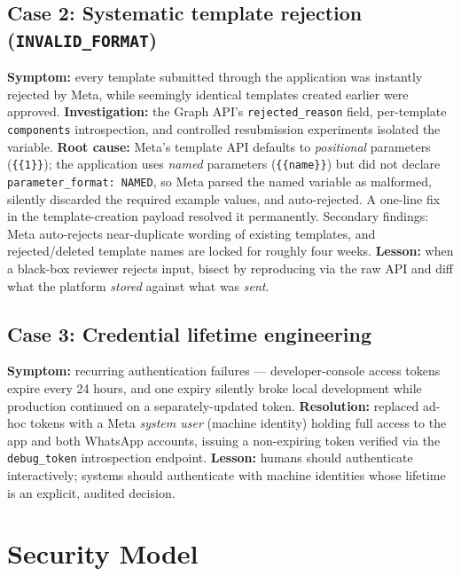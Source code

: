 \documentclass[11pt,a4paper]{article}
\begin{document}
\subsection{Case 2: Systematic template rejection (\texttt{INVALID\_FORMAT})}
\textbf{Symptom:} every template submitted through the application was
instantly rejected by Meta, while seemingly identical templates created
earlier were approved. \textbf{Investigation:} the Graph API's
\texttt{rejected\_reason} field, per-template \texttt{components}
introspection, and controlled resubmission experiments isolated the
variable. \textbf{Root cause:} Meta's template API defaults to
\emph{positional} parameters (\texttt{\{\{1\}\}}); the application uses
\emph{named} parameters (\texttt{\{\{name\}\}}) but did not declare
\texttt{parameter\_format: NAMED}, so Meta parsed the named variable as
malformed, silently discarded the required example values, and
auto-rejected. A one-line fix in the template-creation payload resolved
it permanently. Secondary findings: Meta auto-rejects near-duplicate
wording of existing templates, and rejected/deleted template names are
locked for roughly four weeks. \textbf{Lesson:} when a black-box reviewer
rejects input, bisect by reproducing via the raw API and diff what the
platform \emph{stored} against what was \emph{sent}.

\subsection{Case 3: Credential lifetime engineering}
\textbf{Symptom:} recurring authentication failures --- developer-console
access tokens expire every 24 hours, and one expiry silently broke local
development while production continued on a separately-updated token.
\textbf{Resolution:} replaced ad-hoc tokens with a Meta \emph{system user}
(machine identity) holding full access to the app and both WhatsApp
accounts, issuing a non-expiring token verified via the
\texttt{debug\_token} introspection endpoint. \textbf{Lesson:} humans
should authenticate interactively; systems should authenticate with
machine identities whose lifetime is an explicit, audited decision.

\section{Security Model}
\end{document}
